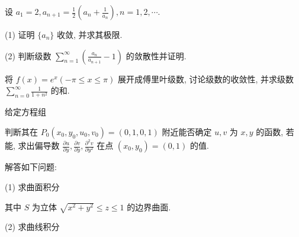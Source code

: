 设 $a_1 = 2, a_{n+1} = \frac{1}{2}\left(a_n + \frac{1}{a_n}\right), n = 1, 2, \cdots$.\par
(1) 证明 $\{a_{n}\}$ 收敛, 并求其极限.\par
(2) 判断级数 $\sum_{n=1}^{\infty}\left(\frac{a_n}{a_{n+1}} - 1\right)$ 的敛散性并证明.\par
将 $f(x) = e^{x} \left(-\pi \leq x \leq \pi\right)$ 展开成傅里叶级数, 讨论级数的收敛性, 并求级数 $\sum_{n=0}^{\infty} \frac{1}{1 + n^2}$ 的和.\par
\par{}
给定方程组\par
\nopagebreak[4]
判断其在 $P_0(x_0, y_0, u_0, v_0) = (0, 1, 0, 1)$ 附近能否确定 $u, v$ 为 $x, y$ 的函数, 若能, 求出偏导数 $\frac{\partial u}{\partial y}, \frac{\partial v}{\partial y}, \frac{\partial^2 v}{\partial y^2}$ 在点 $(x_0, y_0) = (0, 1)$ 的值.\par
解答如下问题:\par
\par{}
(1) 求曲面积分\par
\nopagebreak[4]
其中 $S$ 为立体 $\sqrt{x^2 + y^2} \leq z \leq 1$ 的边界曲面.\par
\par{}
(2) 求曲线积分\par
\nopagebreak[4]
